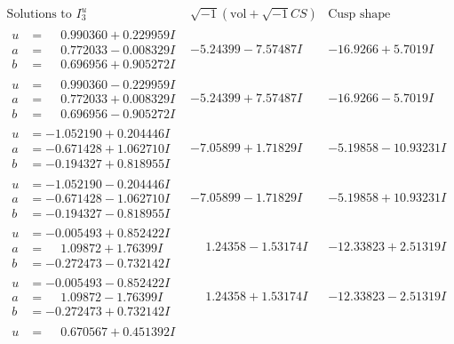 \documentclass[1p]{elsarticle_modified}
\theoremstyle{definition}
\newcommand{\I}{\sqrt{-1}}
\begin{document}
$$\begin{array}{c|c|c}  
\text{Solutions to }I^u_{3}& \I (\text{vol} + \sqrt{-1}CS) & \text{Cusp shape}\\
 \hline 
\begin{aligned}
u &= \phantom{-}0.990360 + 0.229959 I \\
a &= \phantom{-}0.772033 - 0.008329 I \\
b &= \phantom{-}0.696956 + 0.905272 I\end{aligned}
 & -5.24399 - 7.57487 I & -16.9266 + 5.7019 I \\ \hline\begin{aligned}
u &= \phantom{-}0.990360 - 0.229959 I \\
a &= \phantom{-}0.772033 + 0.008329 I \\
b &= \phantom{-}0.696956 - 0.905272 I\end{aligned}
 & -5.24399 + 7.57487 I & -16.9266 - 5.7019 I \\ \hline\begin{aligned}
u &= -1.052190 + 0.204446 I \\
a &= -0.671428 + 1.062710 I \\
b &= -0.194327 + 0.818955 I\end{aligned}
 & -7.05899 + 1.71829 I & -5.19858 - 10.93231 I \\ \hline\begin{aligned}
u &= -1.052190 - 0.204446 I \\
a &= -0.671428 - 1.062710 I \\
b &= -0.194327 - 0.818955 I\end{aligned}
 & -7.05899 - 1.71829 I & -5.19858 + 10.93231 I \\ \hline\begin{aligned}
u &= -0.005493 + 0.852422 I \\
a &= \phantom{-}1.09872 + 1.76399 I \\
b &= -0.272473 - 0.732142 I\end{aligned}
 & \phantom{-}1.24358 - 1.53174 I & -12.33823 + 2.51319 I \\ \hline\begin{aligned}
u &= -0.005493 - 0.852422 I \\
a &= \phantom{-}1.09872 - 1.76399 I \\
b &= -0.272473 + 0.732142 I\end{aligned}
 & \phantom{-}1.24358 + 1.53174 I & -12.33823 - 2.51319 I \\ \hline\begin{aligned}
u &= \phantom{-}0.670567 + 0.451392 I \\

\end{aligned}
\end{array}$$
\end{document}
